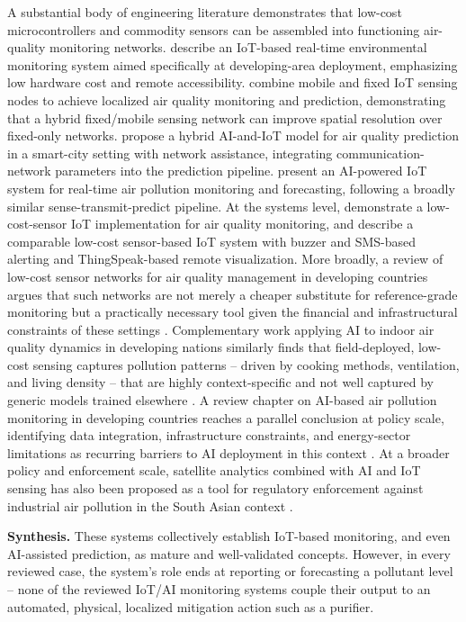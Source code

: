 A substantial body of engineering literature demonstrates that low-cost microcontrollers and commodity sensors can be assembled into functioning air-quality monitoring networks. \citet{alam2025iot} describe an IoT-based real-time environmental monitoring system aimed specifically at developing-area deployment, emphasizing low hardware cost and remote accessibility. \citet{zhang2020realtime} combine mobile and fixed IoT sensing nodes to achieve localized air quality monitoring and prediction, demonstrating that a hybrid fixed/mobile sensing network can improve spatial resolution over fixed-only networks. \citet{kataria2022aiiot} propose a hybrid AI-and-IoT model for air quality prediction in a smart-city setting with network assistance, integrating communication-network parameters into the prediction pipeline. \citet{mani2021aipowered} present an AI-powered IoT system for real-time air pollution monitoring and forecasting, following a broadly similar sense-transmit-predict pipeline. At the systems level, \citet{ramadhani2025iot} demonstrate a low-cost-sensor IoT implementation for air quality monitoring, and \citet{pavan2025realtime} describe a comparable low-cost sensor-based IoT system with buzzer and SMS-based alerting and ThingSpeak-based remote visualization. More broadly, a review of low-cost sensor networks for air quality management in developing countries argues that such networks are not merely a cheaper substitute for reference-grade monitoring but a practically necessary tool given the financial and infrastructural constraints of these settings \citep{shabbir2025paradigm}. Complementary work applying AI to indoor air quality dynamics in developing nations similarly finds that field-deployed, low-cost sensing captures pollution patterns -- driven by cooking methods, ventilation, and living density -- that are highly context-specific and not well captured by generic models trained elsewhere \citep{karmakar2024exploring}. A review chapter on AI-based air pollution monitoring in developing countries reaches a parallel conclusion at policy scale, identifying data integration, infrastructure constraints, and energy-sector limitations as recurring barriers to AI deployment in this context \citep{noman2025aiair}. At a broader policy and enforcement scale, satellite analytics combined with AI and IoT sensing has also been proposed as a tool for regulatory enforcement against industrial air pollution in the South Asian context \citep{ahmed2025smart}.

\textbf{Synthesis.} These systems collectively establish IoT-based monitoring, and even AI-assisted prediction, as mature and well-validated concepts. However, in every reviewed case, the system's role ends at reporting or forecasting a pollutant level -- none of the reviewed IoT/AI monitoring systems couple their output to an automated, physical, localized mitigation action such as a purifier.

